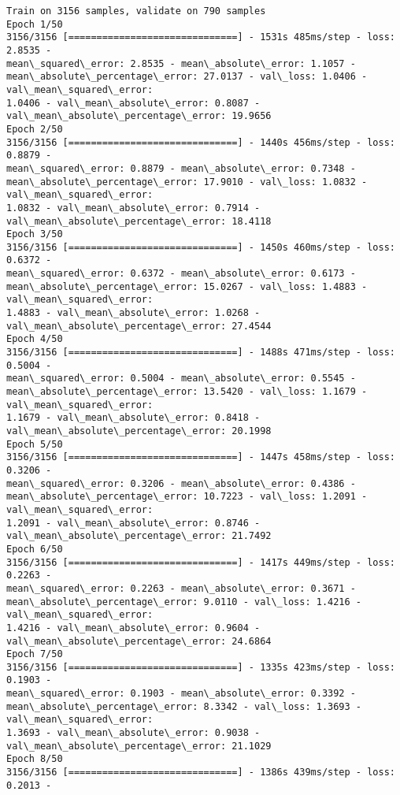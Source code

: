 \documentclass[11pt]{article}
\begin{document}
    \begin{Verbatim}[commandchars=\\\{\},fontsize=\footnotesize]
Train on 3156 samples, validate on 790 samples
Epoch 1/50
3156/3156 [==============================] - 1531s 485ms/step - loss: 2.8535 -
mean\_squared\_error: 2.8535 - mean\_absolute\_error: 1.1057 -
mean\_absolute\_percentage\_error: 27.0137 - val\_loss: 1.0406 - val\_mean\_squared\_error:
1.0406 - val\_mean\_absolute\_error: 0.8087 - val\_mean\_absolute\_percentage\_error: 19.9656
Epoch 2/50
3156/3156 [==============================] - 1440s 456ms/step - loss: 0.8879 -
mean\_squared\_error: 0.8879 - mean\_absolute\_error: 0.7348 -
mean\_absolute\_percentage\_error: 17.9010 - val\_loss: 1.0832 - val\_mean\_squared\_error:
1.0832 - val\_mean\_absolute\_error: 0.7914 - val\_mean\_absolute\_percentage\_error: 18.4118
Epoch 3/50
3156/3156 [==============================] - 1450s 460ms/step - loss: 0.6372 -
mean\_squared\_error: 0.6372 - mean\_absolute\_error: 0.6173 -
mean\_absolute\_percentage\_error: 15.0267 - val\_loss: 1.4883 - val\_mean\_squared\_error:
1.4883 - val\_mean\_absolute\_error: 1.0268 - val\_mean\_absolute\_percentage\_error: 27.4544
Epoch 4/50
3156/3156 [==============================] - 1488s 471ms/step - loss: 0.5004 -
mean\_squared\_error: 0.5004 - mean\_absolute\_error: 0.5545 -
mean\_absolute\_percentage\_error: 13.5420 - val\_loss: 1.1679 - val\_mean\_squared\_error:
1.1679 - val\_mean\_absolute\_error: 0.8418 - val\_mean\_absolute\_percentage\_error: 20.1998
Epoch 5/50
3156/3156 [==============================] - 1447s 458ms/step - loss: 0.3206 -
mean\_squared\_error: 0.3206 - mean\_absolute\_error: 0.4386 -
mean\_absolute\_percentage\_error: 10.7223 - val\_loss: 1.2091 - val\_mean\_squared\_error:
1.2091 - val\_mean\_absolute\_error: 0.8746 - val\_mean\_absolute\_percentage\_error: 21.7492
Epoch 6/50
3156/3156 [==============================] - 1417s 449ms/step - loss: 0.2263 -
mean\_squared\_error: 0.2263 - mean\_absolute\_error: 0.3671 -
mean\_absolute\_percentage\_error: 9.0110 - val\_loss: 1.4216 - val\_mean\_squared\_error:
1.4216 - val\_mean\_absolute\_error: 0.9604 - val\_mean\_absolute\_percentage\_error: 24.6864
Epoch 7/50
3156/3156 [==============================] - 1335s 423ms/step - loss: 0.1903 -
mean\_squared\_error: 0.1903 - mean\_absolute\_error: 0.3392 -
mean\_absolute\_percentage\_error: 8.3342 - val\_loss: 1.3693 - val\_mean\_squared\_error:
1.3693 - val\_mean\_absolute\_error: 0.9038 - val\_mean\_absolute\_percentage\_error: 21.1029
Epoch 8/50
3156/3156 [==============================] - 1386s 439ms/step - loss: 0.2013 -

\end{Verbatim}
\end{document}
